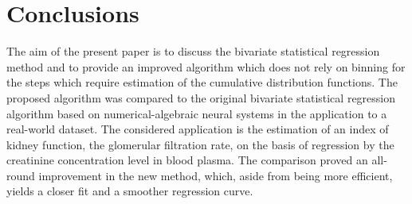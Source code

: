 \documentclass[10pt,final]{siamltex}
\begin{document}
\section{Conclusions}\label{conclusion}
%
The aim of the present paper is to discuss the bivariate statistical regression method and to provide an improved algorithm which does not rely on binning for the steps which require estimation of the cumulative distribution functions. The proposed algorithm was compared to the original bivariate statistical regression algorithm based on numerical-algebraic neural systems in the application to a real-world dataset. The considered application is the estimation of an index of kidney function, the glomerular filtration rate, on the basis of regression by the creatinine concentration level in blood plasma. The comparison proved an all-round improvement in the new method, which, aside from being more efficient, yields a closer fit and a smoother regression curve.
%
\end{document}
